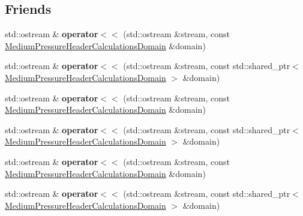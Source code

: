 \subsection*{Friends}
\begin{DoxyCompactItemize}
\item 
\mbox{\label{class_medium_pressure_header_calculations_domain_aed9f969726852f94ce05bd88cb7ffa43}} 
std\+::ostream \& {\bfseries operator$<$$<$} (std\+::ostream \&stream, const \hyperlink{class_medium_pressure_header_calculations_domain}{Medium\+Pressure\+Header\+Calculations\+Domain} \&domain)
\item 
\mbox{\label{class_medium_pressure_header_calculations_domain_ad96cae729daf5e354b3e4d093a35ffa0}} 
std\+::ostream \& {\bfseries operator$<$$<$} (std\+::ostream \&stream, const std\+::shared\+\_\+ptr$<$ \hyperlink{class_medium_pressure_header_calculations_domain}{Medium\+Pressure\+Header\+Calculations\+Domain} $>$ \&domain)
\item 
\mbox{\label{class_medium_pressure_header_calculations_domain_aed9f969726852f94ce05bd88cb7ffa43}} 
std\+::ostream \& {\bfseries operator$<$$<$} (std\+::ostream \&stream, const \hyperlink{class_medium_pressure_header_calculations_domain}{Medium\+Pressure\+Header\+Calculations\+Domain} \&domain)
\item 
\mbox{\label{class_medium_pressure_header_calculations_domain_ad96cae729daf5e354b3e4d093a35ffa0}} 
std\+::ostream \& {\bfseries operator$<$$<$} (std\+::ostream \&stream, const std\+::shared\+\_\+ptr$<$ \hyperlink{class_medium_pressure_header_calculations_domain}{Medium\+Pressure\+Header\+Calculations\+Domain} $>$ \&domain)
\item 
\mbox{\label{class_medium_pressure_header_calculations_domain_aed9f969726852f94ce05bd88cb7ffa43}} 
std\+::ostream \& {\bfseries operator$<$$<$} (std\+::ostream \&stream, const \hyperlink{class_medium_pressure_header_calculations_domain}{Medium\+Pressure\+Header\+Calculations\+Domain} \&domain)
\item 
\mbox{\label{class_medium_pressure_header_calculations_domain_ad96cae729daf5e354b3e4d093a35ffa0}} 
std\+::ostream \& {\bfseries operator$<$$<$} (std\+::ostream \&stream, const std\+::shared\+\_\+ptr$<$ \hyperlink{class_medium_pressure_header_calculations_domain}{Medium\+Pressure\+Header\+Calculations\+Domain} $>$ \&domain)
\end{DoxyCompactItemize}


